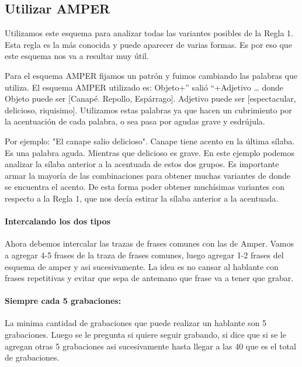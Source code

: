 \documentclass[11pt,a4paper,twoside]{tesis}
\begin{document}
\subsection{Utilizar AMPER}
Utilizamos este esquema para analizar todas las variantes posibles de la Regla 1. Esta regla es la más conocida y puede aparecer de varias formas. Es por eso que este esquema nos va a resultar muy útil. 

Para el esquema AMPER fijamos un patrón y fuimos cambiando las palabras que utiliza. El esquema AMPER utilizado es: Objeto+” salió “+Adjetivo … donde Objeto puede ser [Canapé. Repollo, Espárrago]. Adjetivo puede ser [espectacular, delicioso, riquisimo]. Utilizamos estas palabras ya que hacen un cubrimiento por la acentuación de cada palabra, o sea pasa por agudas grave y esdrújula. 

Por ejemplo: "El canape salio delicioso". Canape tiene acento en la última sílaba. Es una palabra aguda. Mientras que delicioso es grave. En este ejemplo podemos analizar la sílaba anterior a la acentuada de estos dos grupos. Es importante armar la mayoría de las combinaciones para obtener muchas variantes de donde se encuentra el acento. De esta forma poder obtener muchísimas variantes con respecto a la Regla 1, que nos decía estirar la sílaba anterior a la acentuada.   


\paragraph{Intercalando los dos tipos}

Ahora debemos intercalar las trazas de frases comunes con las de Amper. Vamos a agregar 4-5 frases de la traza de frases comunes, luego agregar 1-2 frases del esquema de amper y asi sucesivamente. La idea es no cansar al hablante con frases repetitivas y evitar que sepa de antemano que frase va a tener que grabar.

\paragraph{Siempre cada 5 grabaciones:}
La minima cantidad de grabaciones que puede realizar un hablante son 5 grabaciones. Luego se le pregunta si quiere seguir grabando, si dice que si se le agregan otras 5 grabaciones asi sucesivamente hasta llegar a las 40 que es el total de grabaciones.
\end{document}
